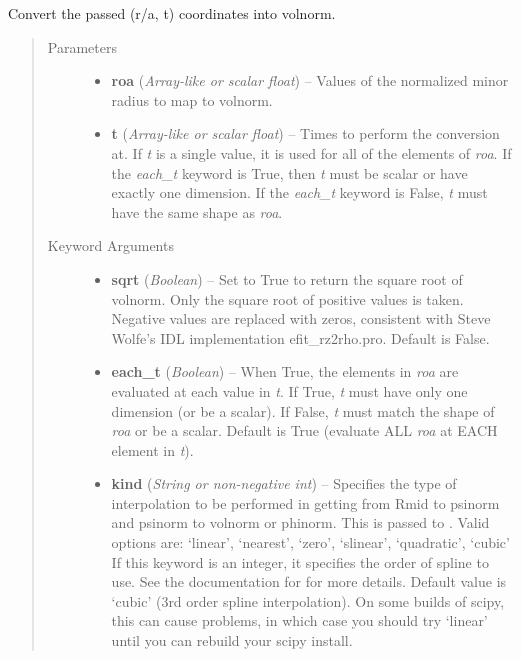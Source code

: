 \documentclass[letterpaper,10pt,english]{sphinxmanual}
\begin{document}
\begin{fulllineitems}
\begin{fulllineitems}
\end{fulllineitems}


\begin{fulllineitems}
\label{eqtools:eqtools.core.Equilibrium.roa2volnorm}
Convert the passed (r/a, t) coordinates into volnorm.
\begin{quote}\begin{description}
\item[{Parameters}] \leavevmode\begin{itemize}
\item {} 
\textbf{roa} (\emph{Array-like or scalar float}) --
Values of the normalized minor
radius to map to volnorm.

\item {} 
\textbf{t} (\emph{Array-like or scalar float}) --
Times to perform the conversion at.
If \emph{t} is a single value, it is used for all of the elements of
\emph{roa}. If the \emph{each\_t} keyword is True, then \emph{t} must be scalar
or have exactly one dimension. If the \emph{each\_t} keyword is False,
\emph{t} must have the same shape as \emph{roa}.

\end{itemize}

\item[{Keyword Arguments}] \leavevmode\begin{itemize}
\item {} 
\textbf{sqrt} (\emph{Boolean}) --
Set to True to return the square root of volnorm.
Only the square root of positive values is taken. Negative
values are replaced with zeros, consistent with Steve Wolfe's
IDL implementation efit\_rz2rho.pro. Default is False.

\item {} 
\textbf{each\_t} (\emph{Boolean}) --
When True, the elements in \emph{roa} are evaluated
at each value in \emph{t}. If True, \emph{t} must have only one dimension
(or be a scalar). If False, \emph{t} must match the shape of \emph{roa}
or be a scalar. Default is True (evaluate ALL \emph{roa} at EACH
element in \emph{t}).

\item {} 
\textbf{kind} (\emph{String or non-negative int}) --
Specifies the type of
interpolation to be performed in getting from Rmid to
psinorm and psinorm to volnorm or phinorm. This is passed to
. Valid options are:
`linear', `nearest', `zero', `slinear', `quadratic', `cubic'
If this keyword is an integer, it specifies the order of spline
to use. See the documentation for  for more
details. Default value is `cubic' (3rd order spline
interpolation). On some builds of scipy, this can cause problems,
in which case you should try `linear' until you can rebuild your
scipy install.


\end{itemize}
\end{description}
\end{quote}
\end{fulllineitems}
\end{fulllineitems}
\end{document}
